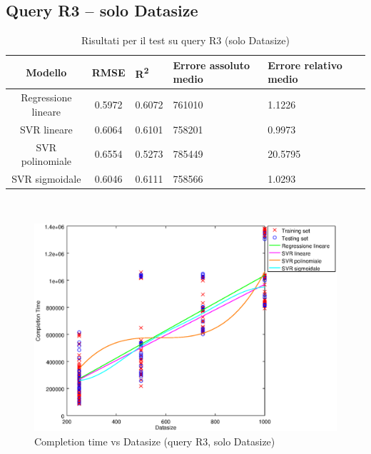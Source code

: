 \documentclass[a4paper,11pt]{article}
\begin{document}
\subsection{Query R3 -- solo Datasize}
\begin{table}[bhpt]
	\centering
	\begin{adjustbox}{center}
		\begin{tabular}{c | c M{1cm} M{2.5cm} M{2.5cm} M{1.8cm}}
			Modello & RMSE & R\textsuperscript{2} & Errore assoluto medio & Errore relativo medio \tabularnewline
			\hline
			Regressione lineare & 0.5972 & 0.6072 & 761010 & 1.1226 \\
			SVR lineare & 0.6064 & 0.6101 & 758201 & 0.9973 \\
			SVR polinomiale & 0.6554 & 0.5273 & 785449 & 20.5795 \\
			SVR sigmoidale & 0.6046 & 0.6111 & 758566 & 1.0293 \\
		\end{tabular}
	\end{adjustbox}
	\\
	\caption{Risultati per il test su query R3 (solo Datasize)}
	\label{table_R3_datasize}
\end{table}

\begin {figure}[hbtp]
\centering
\includegraphics[width=\textwidth]{output/R3_SOLO_DATASIZE/plot_R3.eps}
\caption {Completion time vs Datasize (query R3, solo Datasize)}
\end {figure}

\newpage
\end{document}
